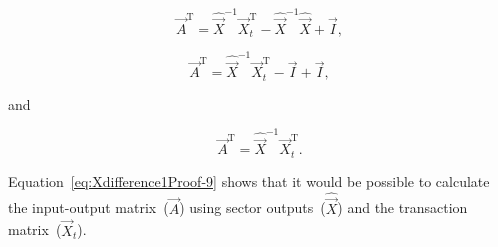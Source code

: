 \begin{equation}\label{eq:Xdifference1Proof-7}
	\vec{A}^\mathrm{T} 
	= \hat{\vec{X}}^{-1} \vec{X}_{t}^\mathrm{T} 
	- \hat{\vec{X}}^{-1} \hat{\vec{X}}
	+ \vec{I},	
\end{equation}

\begin{equation}\label{eq:Xdifference1Proof-8}
	\vec{A}^\mathrm{T} 
	= \hat{\vec{X}}^{-1} \vec{X}_{t}^\mathrm{T} 
	- \vec{I}
	+ \vec{I},	
\end{equation}

\noindent{}and

\begin{equation}\label{eq:Xdifference1Proof-9}
	\vec{A}^\mathrm{T} 
	= \hat{\vec{X}}^{-1} \vec{X}_{t}^\mathrm{T}. 
\end{equation}

Equation~\ref{eq:Xdifference1Proof-9} shows that it would be possible
to calculate the input-output matrix~($\vec{A}$) using
sector outputs~($\hat{\vec{X}}$) and the transaction matrix~($\vec{X}_{t}$).



